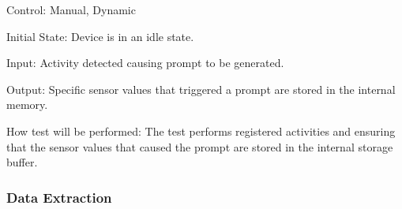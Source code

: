 \documentclass[12pt, titlepage]{article}
\begin{document}
\begin{enumerate}
		Control: Manual, Dynamic
							
		Initial State: Device is in an idle state.
							
		Input: Activity detected causing prompt to be generated.
		
		Output: Specific sensor values that triggered a prompt are stored in the internal memory.
							
		How test will be performed: The test performs registered activities and ensuring that the sensor values that caused the prompt are stored in the internal storage buffer.
\end{enumerate}
\subsubsection{Data Extraction}
\end{document}

